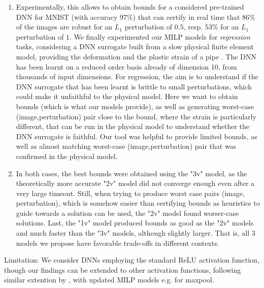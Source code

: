 \begin{enumerate}
\item Experimentally, this allows to obtain bounds for a considered pre-trained DNN for MNIST (with accuracy $97\%$) that can certify in real time that $86\%$ of the images are robust for an $L_1$ perturbation of $0.5$, resp. $53\%$ for an $L_1$ perturbation of $1$. We finally experimented our MILP models for {\em regression} tasks, considering a DNN surrogate built from a slow physical finite element model, providing the deformation and the plastic strain of a pipe \cite{aiware}. The DNN has been learnt on a reduced order basis already of dimension 10, from thousands of input dimensions. For regression, the aim is to understand if the DNN surrogate that has been learnt is brittle to small perturbations, which could make it unfaithful to the physical model. Here we want to obtain bounds (which is what our models provide), as well as generating worst-case (image,perturbation) pair close to the bound, where the strain is particularly different, that can be run in the physical model to understand whether the DNN surrogate is faithful. Our tool was helpful to provide limited bounds, as well as almost matching worst-case (image,perturbation) pair that was confirmed in the physical model.

\item In both cases, the best bounds were obtained using the "3v" model, as the theoretically more accurate "2v" model did not converge enough even after a very large timeout. Still, when trying to produce worst case pairs (image, perturbation), which is somehow easier than certifying bounds as heuristics to guide towards a solution can be used, the "2v" model found worser-case solutions. Last, the "1v" model produced bounds as good as the "2v" models and much faster than the "3v" models, although slightly larger. That is, all 3 models we propose have favorable trade-offs in different contexts.
\end{enumerate}

Limitation: We consider DNNs employing the standard ReLU activation function, though our findings can be extended to other activation functions, following similar extention by \cite{DivideAndSlide}, with updated MILP models e.g. for maxpool. 



